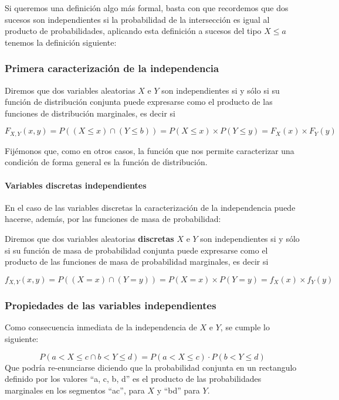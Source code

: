 \documentclass[
]{article}
\begin{document}
Si queremos una definición algo más formal, basta con que recordemos que dos sucesos son independientes si la probabilidad de la intersección es igual al producto de probabilidades, aplicando esta definición a sucesos del tipo \(X \leq a\) tenemos la definición siguiente:

\subsubsection{Primera caracterización de la independencia}\label{primera-caracterizaciuxf3n-de-la-independencia}

Diremos que dos variables aleatorias \(X\) e \(Y\) son independientes si y sólo si su función de distribución conjunta puede expresarse como el producto de las funciones de distribución marginales, es decir si

\[
F_{X,Y}(x,y)= P\left( (X \leq x) \cap (Y \leq b)\right)=P(X \leq x) \times P(Y \leq y)=F_{X}(x) \times F_{Y}(y)
\]

Fijémonos que, como en otros casos, la función que nos permite caracterizar una condición de forma general es la función de distribución.

\paragraph{Variables discretas independientes}\label{variables-discretas-independientes}

En el caso de las variables discretas la caracterización de la independencia puede hacerse, además, por las funciones de masa de probabilidad:

Diremos que dos variables aleatorias \textbf{discretas} \(X\) e \(Y\) son independientes si y sólo si su función de masa de probabilidad conjunta puede expresarse como el producto de las funciones de masa de probabilidad marginales, es decir si

\[
f_{X,Y}(x,y)= P\left( (X = x) \cap (Y = y)\right)=P(X = x) \times P(Y = y)=f_{X}(x) \times f_{Y}(y)
\]

\subsubsection{Propiedades de las variables independientes}\label{propiedades-de-las-variables-independientes}

Como consecuencia inmediata de la independencia de \(X\) e \(Y\), se cumple lo siguiente:

\[
P(a<X \leq c \cap b<Y \leq d)=P(a<X \leq c) \cdot P(b<Y \leq d)
\]
Que podría re-enunciarse diciendo que la probabilidad conjunta en un rectangulo definido por los valores ``a, c, b, d'' es el producto de las probabilidades marginales en los segmentos ``ac'', para \(X\) y ``bd'' para \(Y\).
\end{document}
